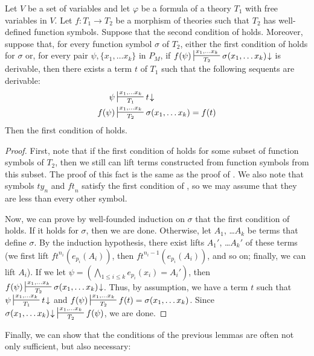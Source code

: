 \documentclass[reqno]{amsart}
\theoremstyle{definition}
\theoremstyle{remark}
\newcommand{\ft}{\mathit{ft}}
\newcommand{\ty}{\mathit{ty}}
\numberwithin{figure}{section}
\begin{document}
\begin{lem}
Let $V$ be a set of variables and let $\varphi$ be a formula of a theory $T_1$ with free variables in $V$.
Let $f : T_1 \to T_2$ be a morphism of theories such that $T_2$ has well-defined function symbols.
Suppose that the second condition of  holds.
Moreover, suppose that, for every function symbol $\sigma$ of $T_2$, either the first condition of  holds for $\sigma$ or,
for every pair $\psi,\{ x_1, \ldots x_k \}$ in $P_M$, if $f(\psi) \sststile{T_2}{x_1, \ldots x_k} \sigma(x_1, \ldots x_k)\!\downarrow$ is derivable, then there exists a term $t$ of $T_1$ such that the following sequents are derivable:
\begin{align*}
\psi & \sststile{T_1}{x_1, \ldots x_k} t\!\downarrow \\
f(\psi) & \sststile{T_2}{x_1, \ldots x_k} \sigma(x_1, \ldots x_k) = f(t)
\end{align*}
Then the first condition of  holds.
\end{lem}
\begin{proof}
First, note that if the first condition of  holds for some subset of function symbols of $T_2$, then we still can lift terms constructed from function symbols from this subset.
The proof of this fact is the same as the proof of .
We also note that symbols $\ty_n$ and $\ft_n$ satisfy the first condition of , so we may assume that they are less than every other symbol.

Now, we can prove by well-founded induction on $\sigma$ that the first condition of  holds.
If it holds for $\sigma$, then we are done.
Otherwise, let $A_1$, \ldots $A_k$ be terms that define $\sigma$.
By the induction hypothesis, there exist lifts $A_1'$, \ldots $A_k'$ of these terms (we first lift $\ft^{n_i}(e_{p_i}(A_i))$, then $\ft^{n_i-1}(e_{p_i}(A_i))$, and so on; finally, we can lift $A_i$).
If we let $\psi = (\bigwedge_{1 \leq i \leq k} e_{p_i}(x_i) = A_i')$, then $f(\psi) \sststile{T_2}{x_1, \ldots x_k} \sigma(x_1, \ldots x_k)\!\downarrow$.
Thus, by assumption, we have a term $t$ such that $\psi \sststile{T_1}{x_1, \ldots x_k} t\!\downarrow$ and $f(\psi) \sststile{T_2}{x_1, \ldots x_k} f(t) = \sigma(x_1, \ldots x_k)$.
Since $\sigma(x_1, \ldots x_k)\!\downarrow\ \sststile{T_2}{x_1, \ldots x_k} f(\psi)$, we are done.
\end{proof}

Finally, we can show that the conditions of the previous lemmas are often not only sufficient, but also necessary:
\end{document}
